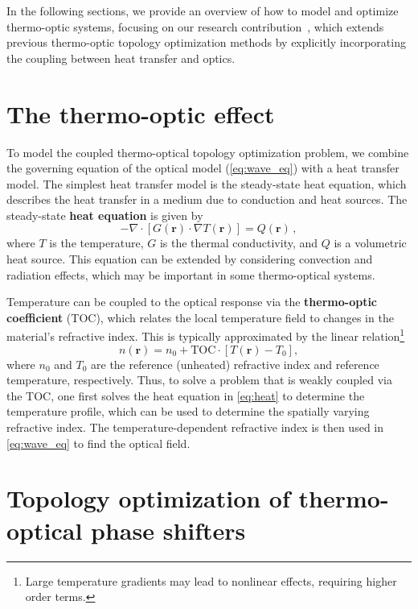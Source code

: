 In the following sections, we provide an overview of how to model and optimize thermo-optic systems, 
focusing on our research contribution~\cite{ownpub0}, which extends previous thermo-optic topology 
optimization methods by explicitly incorporating the coupling between heat transfer and optics.

\section{The thermo-optic effect}\label{sec:to_effect}

To model the coupled thermo-optical topology optimization problem, we combine the governing equation of the optical model (\eqref{eq:wave_eq})
with a heat transfer model. The simplest heat transfer model is the steady-state heat equation, which describes the
heat transfer in a medium due to conduction and heat sources. The steady-state \textbf{heat equation} is given by
\begin{equation}\label{eq:heat}
 -\nabla \cdot \left[ G(\mathbf{r})\cdot \nabla T(\mathbf{r}) \right] = Q(\mathbf{r})\,,
\end{equation}
where $T$ is the temperature, $G$ is the thermal conductivity, and $Q$ is a volumetric heat source. This equation can be
extended by considering convection and radiation effects, which may be important in some thermo-optical systems.

Temperature can be coupled to the optical response via the \textbf{thermo-optic coefficient} (TOC), which relates the local temperature field
to changes in the material's refractive index. This is typically approximated by the linear relation\footnote{Large temperature gradients may lead to nonlinear effects, requiring higher order terms.}
\begin{equation}
n(\mathbf{r}) = n_0 + \text{TOC} \cdot \left[T(\mathbf{r}) - T_0\right],
\end{equation}
where $n_0$ and $T_0$ are the reference (unheated) refractive index and reference temperature, respectively. Thus, to solve a problem that is weakly coupled via the TOC, one first solves the heat equation
in \eqref{eq:heat}
to determine the temperature profile, which can be used to determine
the spatially varying refractive index. The temperature-dependent refractive index is then used in \eqref{eq:wave_eq} to find the optical field.

\section{Topology optimization of thermo-optical phase shifters~\cite{ownpub0}}\label{sec:TOPS}

